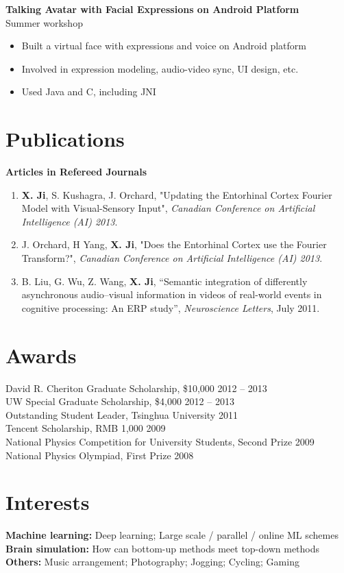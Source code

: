 \documentclass[margin]{res}
\begin{document}
\begin{resume}
 {\bf Talking Avatar with Facial Expressions on Android Platform}\\
 Summer workshop
  \begin{itemize} \itemsep -2pt
   \item Built a virtual face with expressions and voice on Android platform
   \item Involved in expression modeling, audio-video sync, UI design, etc.
   \item Used Java and C, including JNI
 \end{itemize}



\section{Publications} 

 {\bf Articles in Refereed Journals}\\
 \begin{enumerate} \itemsep -2pt
\item {\bf X. Ji}, S. Kushagra, J. Orchard, "Updating the Entorhinal Cortex Fourier Model with Visual-Sensory Input", {\em Canadian Conference on Artificial Intelligence (AI) 2013}.
\item J. Orchard, H Yang, {\bf X. Ji}, "Does the Entorhinal Cortex use the Fourier Transform?",  {\em Canadian Conference on Artificial Intelligence (AI) 2013}.
\item B. Liu, G. Wu, Z. Wang, {\bf X. Ji}, ``Semantic integration of differently asynchronous audio–visual information in videos of real-world events in cognitive processing: An ERP study'', {\em Neuroscience Letters}, July 2011. 
\end{enumerate}


\section{Awards}

David R. Cheriton Graduate Scholarship, \$10,000 \hfill 2012 -- 2013\\
UW Special Graduate Scholarship, \$4,000 \hfill 2012 -- 2013\\
Outstanding Student Leader, Tsinghua University \hfill 2011\\
Tencent Scholarship, RMB 1,000 \hfill 2009\\
National Physics Competition for University Students, Second Prize \hfill 2009\\
National Physics Olympiad, First Prize \hfill 2008\\



\section{Interests}
{\bf Machine learning:} Deep learning; Large scale / parallel / online ML schemes\\
{\bf Brain simulation:} How can bottom-up methods meet top-down methods\\
{\bf Others:} Music arrangement; Photography; Jogging; Cycling; Gaming\\

\end{resume} 
\end{document}
